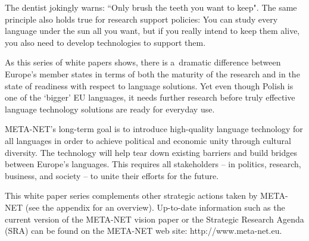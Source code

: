 \begin{multicols}{2}

The dentist jokingly warns: ``Only brush the teeth you want to keep".
 The same principle also holds true for research support policies: You can study every language under the sun all you want, but if you really 
intend to keep them alive, you also need to develop technologies to support them.

As this series of white papers shows, there is a~dramatic difference
between Europe’s member states in terms of both the maturity of the research and in the state of readiness with respect to language solutions. Yet even though Polish is one of the ‘bigger’ EU languages, it needs further
research before truly effective language technology solutions are
ready for everyday use. 

META-NET’s long-term goal is to introduce high-quality language
technology for all languages in order to achieve political and
economic unity through cultural diversity. The technology will help
tear down existing barriers and build bridges between Europe’s
languages. This requires all stakeholders -- in politics, research,
business, and society -- to unite their efforts for the future. 

This white paper series complements other strategic actions taken by
META-NET (see the appendix for an overview). Up-to-date information
such as the current version of the META-NET vision paper \cite{Meta1}
or the Strategic Research Agenda (SRA) can be found on the META-NET
web site: http://www.meta-net.eu. 

\end{multicols} \clearpage 


